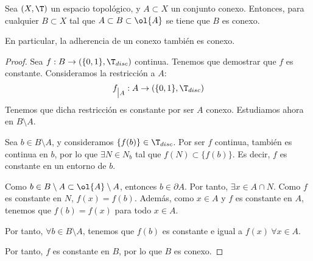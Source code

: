 \begin{teo}
    Sea $(X,\T)$ un espacio topológico, y $A\subset X$ un conjunto conexo. Entonces, para cualquier $B\subset X$ tal que $A\subset B\subset \ol{A}$ se tiene que $B$ es conexo.

    En particular, la adherencia de un conexo también es conexo.
\end{teo}
\begin{proof}
    Sea $f:B\to (\{0,1\},\T_{disc})$ continua. Tenemos que demostrar que $f$ es constante. Consideramos la restricción a $A$:
    \begin{equation*}
        f_{\big| A}: A \to (\{0,1\},\T_{disc})
    \end{equation*}
    Tenemos que dicha restricción es constante por ser $A$ conexo.
    Estudiamos ahora en $B\setminus A$.

    Sea $b\in B\setminus A$, y consideramos $\{f(b)\}\in \T_{disc}$. Por ser $f$ continua, también es continua en $b$,
    por lo que $\exists N\in N_b$ tal que $f(N)\subset \{f(b)\}$. Es decir, $f$ es constante en un entorno de $b$.

    Como $b\in B\setminus A \subset \ol{A}\setminus A$, entonces $b\in \partial A$. Por tanto, $\exists x\in A\cap N$. Como $f$ es constante en $N$, $f(x)=f(b)$. Además, como $x\in A$ y $f$ es constante en $A$, tenemos que $f(b)=f(x)$ para todo $x\in A$.

    Por tanto, $\forall b\in B\setminus A$, tenemos que $f(b)$ es constante e igual a $f(x)~\forall x\in A$.

    Por tanto, $f$ es constante en $B$, por lo que $B$ es conexo.
\end{proof}



